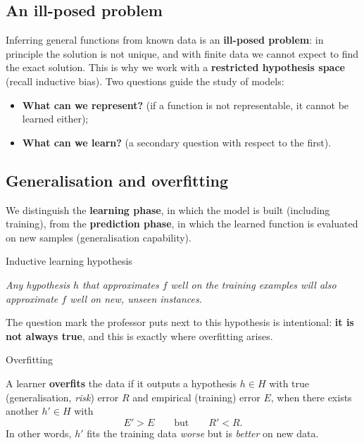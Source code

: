\subsection{An ill-posed problem}\label{un-problema-mal-posto}

Inferring general functions from known data is an \textbf{ill-posed
problem}: in principle the solution is not unique, and with finite data
we cannot expect to find the exact solution. This is why we work with
a \textbf{restricted hypothesis space} (recall inductive bias). Two
questions guide the study of models:

\begin{itemize}
\tightlist
\item
  \textbf{What can we represent?} (if a function is not representable,
  it cannot be learned either);
\item
  \textbf{What can we learn?} (a secondary question with respect to
  the first).
\end{itemize}

\subsection{Generalisation and
overfitting}\label{generalizzazione-e-overfitting}

We distinguish the \textbf{learning phase}, in which the model is built
(including training), from the \textbf{prediction phase}, in which the
learned function is evaluated on new samples (generalisation
capability).

\begin{boxdefinition}{Inductive learning hypothesis}

\emph{Any hypothesis \(h\) that approximates \(f\) well on the training
examples will also approximate \(f\) well on new, unseen instances.}

\end{boxdefinition}

The question mark the professor puts next to this hypothesis is
intentional: \textbf{it is not always true}, and this is exactly where
overfitting arises.

\begin{boxdefinition}{Overfitting}

A learner \textbf{overfits} the data if it outputs a hypothesis
\(h \in H\) with true (generalisation, \emph{risk}) error \(R\) and
empirical (training) error \(E\), when there exists another
\(h' \in H\) with \[
E' > E \qquad \text{but} \qquad R' < R.
\] In other words, \(h'\) fits the training data \emph{worse} but is
\emph{better} on new data.

\end{boxdefinition}

